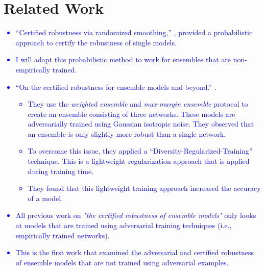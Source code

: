 \documentclass{article}
\begin{document}
\section{Related Work}
\textcolor{blue}{
\begin{itemize}
    \item “Certified robustness via randomized smoothing,” \cite{reference4}, provided a probabilistic approach to certify the robustness of single models. 
    \item I will adapt this probabilistic method to work for ensembles that are non-empirically trained. 
    \item “On the certified robustness for ensemble models and beyond.” \cite{reference6}.
    \begin{itemize}
        \item They use the \textit{weighted ensemble} and \textit{max-margin ensemble} protocol to create an ensemble consisting of three networks. These models are adversarially trained using Gaussian isotropic noise. They observed that an ensemble is only slightly more robust than a single network.
    \end{itemize}
    \begin{itemize}
        \item To overcome this issue, they applied a “Diversity-Regularized-Training” \cite{reference6} technique. This is a lightweight regularization approach that is applied during training time.
        \item They found that this lightweight training approach increased the accuracy of a model. 
    \end{itemize}
    \item All previous work on \textit{"the certified robustness of ensemble models"} only looks at models that are trained using adversarial training techniques (i.e., empirically trained networks).
    \item This is the first work that examined the adversarial and certified robustness of ensemble models that are not trained using adversarial examples.
\end{itemize}
}
\end{document}
